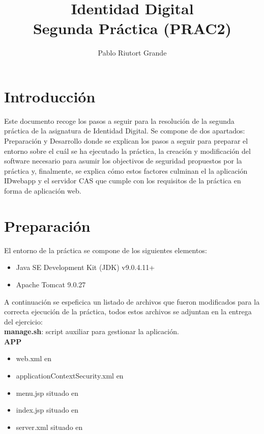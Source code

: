 \documentclass[10pt,a4paper]{article}
\author{Pablo Riutort Grande}
\title{Identidad Digital\\ \vspace{1cm}\textbf{Segunda Práctica (PRAC2)}}
\begin{document}
\maketitle
\pagebreak

\section*{Introducción}
Este documento recoge los pasos a seguir para la resolución de la segunda práctica de la asignatura de Identidad Digital. Se compone de dos apartados: Preparación y Desarrollo donde se explican los pasos a seguir para preparar el entorno sobre el cuál se ha ejecutado la práctica, la creación y modificación del software necesario para asumir los objectivos de seguridad propuestos por la práctica y, finalmente, se explica cómo estos factores culminan el la aplicación IDwebapp y el servidor CAS que cumple con los requisitos de la práctica en forma de aplicación web.

\section*{Preparación}
El entorno de la práctica se compone de los siguientes elementos:
\begin{itemize}
\item Java SE Development Kit (JDK) v9.0.4.11+
\item Apache Tomcat 9.0.27
\end{itemize}

A continuación se espeficica un listado de archivos que fueron modificados para la correcta ejecución de la práctica, todos estos archivos se adjuntan en la entrega del ejercicio:\\

\textbf{manage.sh}: script auxiliar para gestionar la aplicación.\\

\textbf{APP}
\begin{itemize}
\item web.xml en 
\item applicationContextSecurity.xml en \\ 
\item menu.jsp situado en 
\item index.jsp situado en 
\item server.xml situado en 
\end{itemize}
\vspace{.3cm}
\end{document}

